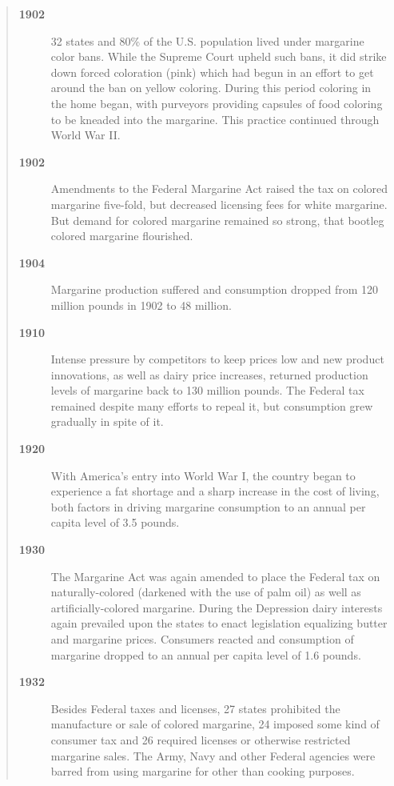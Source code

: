 \documentclass[mnsc,blindrev]{informs3}
\begin{document}
\begin{quotation}

\begin{description}

\item[\bf 1902] 32 states and 80\% of the U.S. population lived under
margarine color bans. While the Supreme Court upheld such bans, it
did strike down forced coloration (pink) which had begun in an
effort to get around the ban on yellow coloring. During this period
coloring in the home began, with purveyors providing capsules of
food coloring to be kneaded into the margarine. This practice
continued through World War II.

\item[\bf 1902] Amendments to the Federal Margarine Act raised the tax
on colored margarine five-fold, but decreased licensing fees for
white margarine. But demand for colored margarine remained so
strong, that bootleg colored margarine flourished.

\item[\bf 1904] Margarine production suffered and consumption dropped
from 120 million pounds in 1902 to 48 million.

\item[\bf 1910] Intense pressure by competitors to keep prices low and
new product innovations, as well as dairy price increases, returned
production levels of margarine back to 130 million pounds. The
Federal tax remained despite many efforts to repeal it, but
consumption grew gradually in spite of it.

\item[\bf 1920] With America's entry into World War I, the country began
to experience a fat shortage and a sharp increase in the cost of
living,  both factors in driving margarine consumption to an annual
per capita level of 3.5 pounds.

\item[\bf 1930] The Margarine Act was again amended to place the Federal
tax on naturally-colored (darkened with the use of palm oil) as well
as artificially-colored margarine. During the Depression dairy
interests again prevailed upon the states to enact legislation
equalizing butter and margarine prices. Consumers reacted and
consumption of margarine dropped to an annual per capita level of
1.6 pounds.

\item[\bf 1932] Besides Federal taxes and licenses, 27 states prohibited
the manufacture or sale of colored margarine, 24 imposed some kind
of  consumer tax and 26 required licenses or otherwise restricted
margarine sales. The Army, Navy and other Federal agencies were
barred from using margarine for other than cooking purposes.


\end{description}
\end{quotation}
\end{document}
